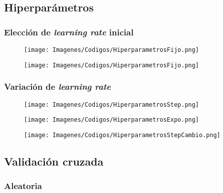 \documentclass{report}
\begin{document}
\subsection{Hiperparámetros}

\subsubsection{Elección de \textit{learning rate} inicial}

\begin{figure}[H]
    \raggedright
    \texttt{[image: Imagenes/Codigos/HiperparametrosFijo.png]}
\end{figure}

\begin{figure}[H]
    \raggedright
    \texttt{[image: Imagenes/Codigos/HiperparametrosFijo.png]}
\end{figure}

\subsubsection{Variación de \textit{learning rate}}

\begin{figure}[H]
    \raggedright
    \texttt{[image: Imagenes/Codigos/HiperparametrosStep.png]}
\end{figure}

\begin{figure}[H]
    \raggedright
    \texttt{[image: Imagenes/Codigos/HiperparametrosExpo.png]}
\end{figure}

\begin{figure}[H]
    \raggedright
    \texttt{[image: Imagenes/Codigos/HiperparametrosStepCambio.png]}
\end{figure}








\newpage
\subsection{Validación cruzada}



\subsubsection{Aleatoria}
\end{document}
